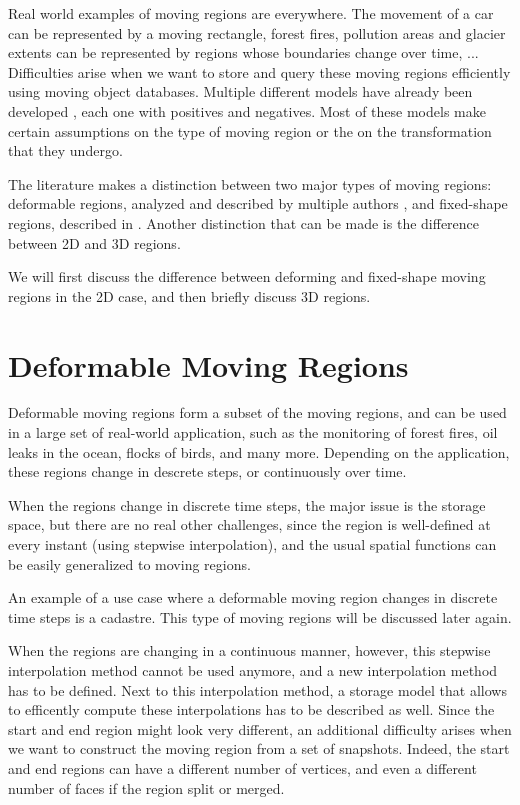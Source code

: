 Real world examples of moving regions are everywhere. The movement of a car can be represented by a moving rectangle, forest fires, pollution areas and glacier extents can be represented by regions whose boundaries change over time, ... Difficulties arise when we want to store and query these moving regions efficiently using moving object databases. Multiple different models have already been developed , each one with positives and negatives. Most of these models make certain assumptions on the type of moving region or the on the transformation that they undergo.

The literature makes a distinction between two major types of moving regions: deformable regions, analyzed and described by multiple authors , and fixed-shape regions, described in . Another distinction that can be made is the difference between 2D and 3D regions. 

We will first discuss the difference between deforming and fixed-shape moving regions in the 2D case, and then briefly discuss 3D regions.

\section{Deformable Moving Regions}

Deformable moving regions form a subset of the moving regions, and can be used in a large set of real-world application, such as the monitoring of forest fires, oil leaks in the ocean, flocks of birds, and many more. Depending on the application, these regions change in descrete steps, or continuously over time. 

When the regions change in discrete time steps, the major issue is the storage space, but there are no real other challenges, since the region is well-defined at every instant (using stepwise interpolation), and the usual spatial functions can be easily generalized to moving regions.

An example of a use case where a deformable moving region changes in discrete time steps is a cadastre. This type of moving regions will be discussed later again.

When the regions are changing in a continuous manner, however, this stepwise interpolation method cannot be used anymore, and a new interpolation method has to be defined. Next to this interpolation method, a storage model that allows to efficently compute these interpolations has to be described as well. Since the start and end region might look very different, an additional difficulty arises when we want to construct the moving region from a set of snapshots. Indeed, the start and end regions can have a different number of vertices, and even a different number of faces if the region split or merged.

